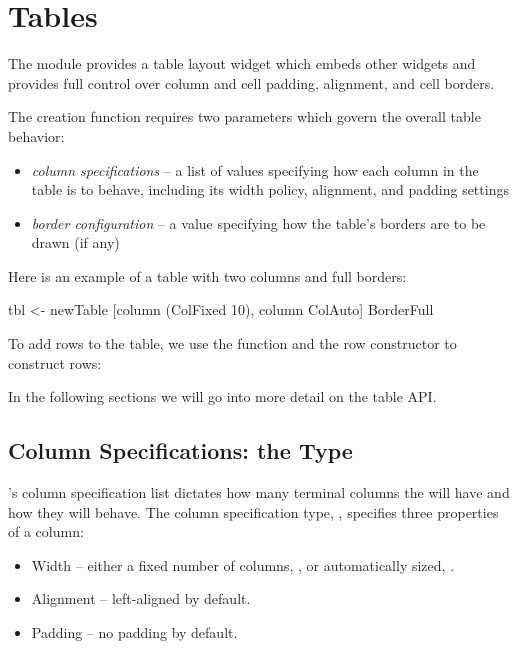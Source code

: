 \section{Tables}
\label{sec:tables}

The  module provides a table layout widget which embeds
other widgets and provides full control over column and cell padding,
alignment, and cell borders.

The  creation function  requires two parameters
which govern the overall table behavior:

\begin{itemize}
\item \textit{column specifications} -- a list of values specifying
  how each column in the table is to behave, including its width
  policy, alignment, and padding settings
\item \textit{border configuration} -- a value specifying how the
  table's borders are to be drawn (if any)
\end{itemize}

Here is an example of a table with two columns and full borders:

\begin{haskellcode}
 tbl <- newTable [column (ColFixed 10), column ColAuto] BorderFull
\end{haskellcode}

To add rows to the table, we use the  function and the row
constructor  to construct rows:


In the following sections we will go into more detail on the table
API.

\subsection{Column Specifications: the  Type}
\label{sec:columnspecs}

's column specification list dictates how many terminal
columns the  will have and how they will behave.  The column
specification type, , specifies three properties of a
column:

\begin{itemize}
\item Width -- either a fixed number of columns, , or
  automatically sized, .
\item Alignment -- left-aligned by default.
\item Padding -- no padding by default.
\end{itemize}

